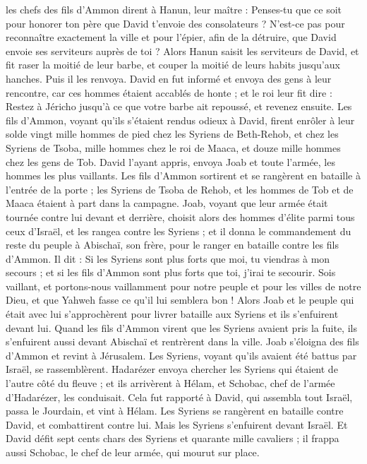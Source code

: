 \begin{multicols}{2}
les chefs des fils d'Ammon dirent à Hanun, leur maître : Penses-tu que ce soit pour honorer ton père que David t'envoie des consolateurs ? N'est-ce pas pour reconnaître exactement la ville et pour l'épier, afin de la détruire, que David envoie ses serviteurs auprès de toi ?
Alors Hanun saisit les serviteurs de David, et fit raser la moitié de leur barbe, et couper la moitié de leurs habits jusqu'aux hanches. Puis il les renvoya.
David en fut informé et envoya des gens à leur rencontre, car ces hommes étaient accablés de honte ; et le roi leur fit dire : Restez à Jéricho jusqu'à ce que votre barbe ait repoussé, et revenez ensuite.
Les fils d'Ammon, voyant qu'ils s'étaient rendus odieux à David, firent enrôler à leur solde vingt mille hommes de pied chez les Syriens de Beth-Rehob, et chez les Syriens de Tsoba, mille hommes chez le roi de Maaca, et douze mille hommes chez les gens de Tob.
David l'ayant appris, envoya Joab et toute l'armée, les hommes les plus vaillants.
Les fils d'Ammon sortirent et se rangèrent en bataille à l'entrée de la porte ; les Syriens de Tsoba de Rehob, et les hommes de Tob et de Maaca étaient à part dans la campagne.
Joab, voyant que leur armée était tournée contre lui devant et derrière, choisit alors des hommes d'élite parmi tous ceux d'Israël, et les rangea contre les Syriens ;
et il donna le commandement du reste du peuple à Abischaï, son frère, pour le ranger en bataille contre les fils d'Ammon.
Il dit : Si les Syriens sont plus forts que moi, tu viendras à mon secours ; et si les fils d'Ammon sont plus forts que toi, j'irai te secourir.
Sois vaillant, et portons-nous vaillamment pour notre peuple et pour les villes de notre Dieu, et que Yahweh fasse ce qu'il lui semblera bon !
Alors Joab et le peuple qui était avec lui s'approchèrent pour livrer bataille aux Syriens et ils s'enfuirent devant lui.
Quand les fils d'Ammon virent que les Syriens avaient pris la fuite, ils s'enfuirent aussi devant Abischaï et rentrèrent dans la ville. Joab s'éloigna des fils d'Ammon et revint à Jérusalem.
Les Syriens, voyant qu'ils avaient été battus par Israël, se rassemblèrent.
Hadarézer envoya chercher les Syriens qui étaient de l'autre côté du fleuve ; et ils arrivèrent à Hélam, et Schobac, chef de l'armée d'Hadarézer, les conduisait.
Cela fut rapporté à David, qui assembla tout Israël, passa le Jourdain, et vint à Hélam. Les Syriens se rangèrent en bataille contre David, et combattirent contre lui.
Mais les Syriens s'enfuirent devant Israël. Et David défit sept cents chars des Syriens et quarante mille cavaliers ; il frappa aussi Schobac, le chef de leur armée, qui mourut sur place.

\end{multicols}
